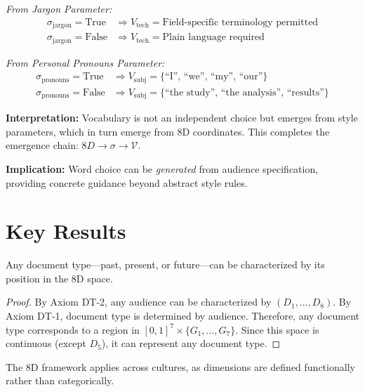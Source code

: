 \begin{tcolorbox}[colback=gray!5!white, colframe=gray!75!black,
    title=Axiom DT-9: Vocabulary Emergence]
\textit{From Jargon Parameter:}
\begin{align}
\sigma_{\text{jargon}} = \text{True} &\Rightarrow V_{\text{tech}} = \text{Field-specific terminology permitted} \\
\sigma_{\text{jargon}} = \text{False} &\Rightarrow V_{\text{tech}} = \text{Plain language required}
\end{align}

\textit{From Personal Pronouns Parameter:}
\begin{align}
\sigma_{\text{pronouns}} = \text{True} &\Rightarrow V_{\text{subj}} = \{\text{``I'', ``we'', ``my'', ``our''}\} \\
\sigma_{\text{pronouns}} = \text{False} &\Rightarrow V_{\text{subj}} = \{\text{``the study'', ``the analysis'', ``results''}\}
\end{align}

\textbf{Interpretation:} Vocabulary is not an independent choice but emerges from
style parameters, which in turn emerge from 8D coordinates. This completes the
emergence chain: $8D \to \sigma \to \mathcal{V}$.

\textbf{Implication:} Word choice can be \textit{generated} from audience specification,
providing concrete guidance beyond abstract style rules.
\end{tcolorbox}


\section{Key Results}
\label{sec:doctype-theory-results}

\begin{proposition}
Any document type---past, present, or future---can be characterized by its
position in the 8D space.
\end{proposition}

\begin{proof}
By Axiom DT-2, any audience can be characterized by $(D_1, ..., D_8)$.
By Axiom DT-1, document type is determined by audience.
Therefore, any document type corresponds to a region in $[0,1]^7 \times \{G_1,...,G_7\}$.
Since this space is continuous (except $D_5$), it can represent any document type.
\end{proof}

\begin{proposition}
The 8D framework applies across cultures, as dimensions are defined
functionally rather than categorically.
\end{proposition}

